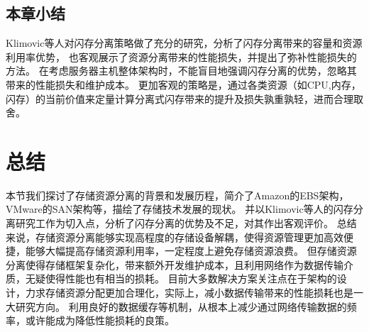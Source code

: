 \subsection{本章小结}
Klimovic等人\cite{klimovic2016flash}对闪存分离策略做了充分的研究，分析了闪存分离带来的容量和资源利用率优势，
也客观展示了资源分离带来的性能损失，并提出了弥补性能损失的方法。
在考虑服务器主机整体架构时，不能盲目地强调闪存分离的优势，忽略其带来的性能损失和维护成本。
更加客观的策略是，通过各类资源（如CPU,内存，闪存）的当前价值来定量计算分离式闪存带来的提升及损失孰重孰轻，进而合理取舍。


\section{总结}
本节我们探讨了存储资源分离的背景和发展历程，简介了Amazon的EBS架构，VMware的SAN架构等，描绘了存储技术发展的现状。
并以Klimovic等人\cite{klimovic2016flash}的闪存分离研究工作为切入点，分析了闪存分离的优势及不足，对其作出客观评价。
总结来说，存储资源分离能够实现高程度的存储设备解耦，使得资源管理更加高效便捷，能够大幅提高存储资源利用率，一定程度上避免存储资源浪费。
但存储资源分离使得存储框架复杂化，带来额外开发维护成本，且利用网络作为数据传输介质，无疑使得性能也有相当的损耗。
目前大多数解决方案关注点在于架构的设计，力求存储资源分配更加合理化，实际上，减小数据传输带来的性能损耗也是一大研究方向。
利用良好的数据缓存等机制，从根本上减少通过网络传输数据的频率，或许能成为降低性能损耗的良策。















